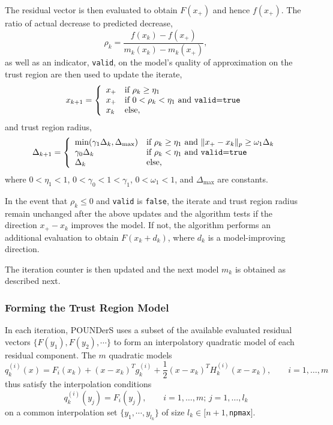 The residual vector is then evaluated to obtain $F(x_+)$ and hence
$f(x_+)$. The ratio of actual decrease to predicted decrease, 
\[
 \rho_k = \frac{f(x_k)-f(x_+)}{m_k(x_k)-m_k(x_+)},
\]
as well as an indicator, \texttt{valid}, on the model's quality of
approximation on the trust region are then used to update the iterate,
\[
x_{k+1} = \left\{\begin{array}{ll}
x_+ & \mbox{if } \rho_k \geq \eta_1 \\
x_+ & \mbox{if } 0<\rho_k <\eta_1  \mbox{ and \texttt{valid}=\texttt{true}}
\\
x_k & \mbox{else}, 
\end{array}
\right.
\]
and trust region radius,
\[
\Delta_{k+1} = \left\{\begin{array}{ll}
 \mbox{min}(\gamma_1\Delta_k, \Delta_{\max}) & \mbox{if } \rho_k \geq
\eta_1 \mbox{ and } \|x_+-x_k\|_p\geq \omega_1\Delta_k \\
\gamma_0\Delta_k & \mbox{if } \rho_k < \eta_1 \mbox{ and
\texttt{valid}=\texttt{true}} \\
\Delta_k &  \mbox{else,}
\end{array}
\right.
\]
where $0 < \eta_1 < 1$,  $0 < \gamma_0 < 1 < \gamma_1$, $0<\omega_1<1$,
and $\Delta_{\max}$ are constants. 

In the event that $\rho_k\leq 0$ and \texttt{valid} is \texttt{false}, the
iterate and trust region radius remain unchanged after the above updates
and the algorithm tests if the direction $x_+-x_k$ improves the model. If
not, the algorithm performs an additional evaluation to obtain
$F(x_k+d_k)$, where $d_k$ is a model-improving direction. 

The iteration counter is then updated and the next model $m_{k}$ is
obtained as described next.

\subsubsection{Forming the Trust Region Model}
In each iteration, POUNDerS uses a subset of the available evaluated
residual vectors $\{ F(y_1), F(y_2), \cdots \}$ to form an interpolatory
quadratic model of each residual component. The $m$ quadratic models
\begin{equation}
 q_k^{(i)}(x) = 
 F_i(x_k) + (x-x_k)^T g_k^{(i)} + \frac{1}{2} (x-x_k)^T H_k^{(i)} (x-x_k), 
 \qquad i = 1, \ldots, m
\label{eq:models}
\end{equation}
thus satisfy the interpolation conditions 
\[ 
 q_k^{(i)}(y_j) = F_i(y_j), \qquad i=1, \ldots, m; \, j=1,\ldots , l_k
\]
on a common interpolation set $\{y_1, \cdots , y_{l_k}\}$ of size
$l_k\in[n+1,$\texttt{npmax}$]$.

